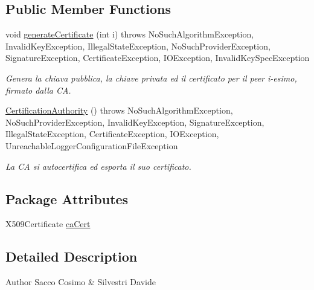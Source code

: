 \subsection*{\-Public \-Member \-Functions}
\begin{DoxyCompactItemize}
\item 
void \hyperlink{classit_1_1saccosilvestri_1_1jsp2p_1_1certification_authority_1_1_certification_authority_acac40170eef762342866fedbee961113}{generate\-Certificate} (int i)  throws No\-Such\-Algorithm\-Exception, 			\-Invalid\-Key\-Exception, Illegal\-State\-Exception, 			\-No\-Such\-Provider\-Exception, Signature\-Exception, Certificate\-Exception, 			\-I\-O\-Exception, Invalid\-Key\-Spec\-Exception 
\begin{DoxyCompactList}\small\item\em \-Genera la chiava pubblica, la chiave privata ed il certificato per il peer i-\/esimo, firmato dalla \-C\-A. \end{DoxyCompactList}\item 
\hyperlink{classit_1_1saccosilvestri_1_1jsp2p_1_1certification_authority_1_1_certification_authority_a137882977c0e3dceef9c8ba7ebdf2dab}{\-Certification\-Authority} ()  throws No\-Such\-Algorithm\-Exception, 			\-No\-Such\-Provider\-Exception, Invalid\-Key\-Exception, Signature\-Exception, 			\-Illegal\-State\-Exception, Certificate\-Exception, I\-O\-Exception, Unreachable\-Logger\-Configuration\-File\-Exception 
\begin{DoxyCompactList}\small\item\em \-La \-C\-A si autocertifica ed esporta il suo certificato. \end{DoxyCompactList}\end{DoxyCompactItemize}
\subsection*{\-Package \-Attributes}
\begin{DoxyCompactItemize}
\item 
\-X509\-Certificate \hyperlink{classit_1_1saccosilvestri_1_1jsp2p_1_1certification_authority_1_1_certification_authority_a778a02a715b6e7fdbcb65edb08c211e8}{ca\-Cert}
\end{DoxyCompactItemize}


\subsection{\-Detailed \-Description}
\begin{DoxyAuthor}{\-Author}
\-Sacco \-Cosimo \& \-Silvestri \-Davide 
\end{DoxyAuthor}


